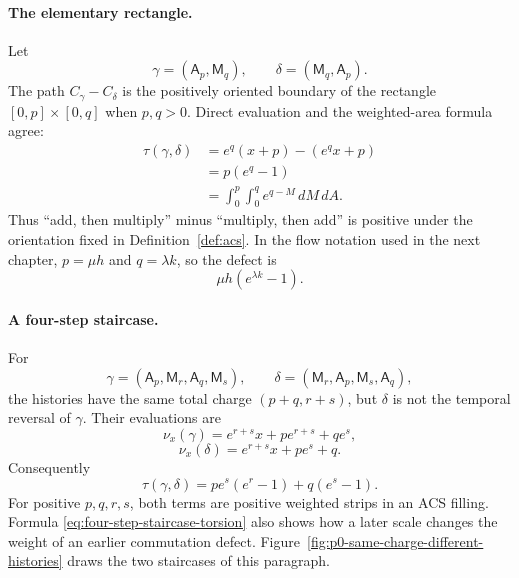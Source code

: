 \paragraph{The elementary rectangle.}
Let
\[
    \gamma=(\mathsf A_p,\mathsf M_q),
    \qquad
    \delta=(\mathsf M_q,\mathsf A_p).
\]
The path \(C_\gamma-C_\delta\) is the positively oriented boundary of the
rectangle \([0,p]\times[0,q]\) when \(p,q>0\).  Direct evaluation and the
weighted-area formula agree:
\begin{align*}
    \tau(\gamma,\delta)
      &=e^q(x+p)-(e^q x+p)\\
      &=p(e^q-1)\\
      &=\int_0^p\int_0^q e^{q-M}\,dM\,dA.
\end{align*}
Thus ``add, then multiply'' minus ``multiply, then add'' is positive under the
orientation fixed in Definition~\ref{def:acs}.  In the flow notation used in
the next chapter, \(p=\mu h\) and \(q=\lambda k\), so the defect is
\[
    \mu h(e^{\lambda k}-1).
\]

\paragraph{A four-step staircase.}
For
\[
    \gamma=(\mathsf A_p,\mathsf M_r,\mathsf A_q,\mathsf M_s),
    \qquad
    \delta=(\mathsf M_r,\mathsf A_p,\mathsf M_s,\mathsf A_q),
\]
the histories have the same total charge \((p+q,r+s)\), but \(\delta\) is not
the temporal reversal of \(\gamma\).  Their evaluations are
\[
    \nu_x(\gamma)=e^{r+s}x+p e^{r+s}+q e^s,
\]
\[
    \nu_x(\delta)=e^{r+s}x+p e^s+q.
\]
Consequently
\begin{equation}
    \tau(\gamma,\delta)
      =p e^s(e^r-1)+q(e^s-1).
    \label{eq:four-step-staircase-torsion}
\end{equation}
For positive \(p,q,r,s\), both terms are positive weighted strips in an ACS
filling.  Formula \eqref{eq:four-step-staircase-torsion} also shows how a later
scale changes the weight of an earlier commutation defect.
Figure~\ref{fig:p0-same-charge-different-histories} draws the two staircases of
this paragraph.

